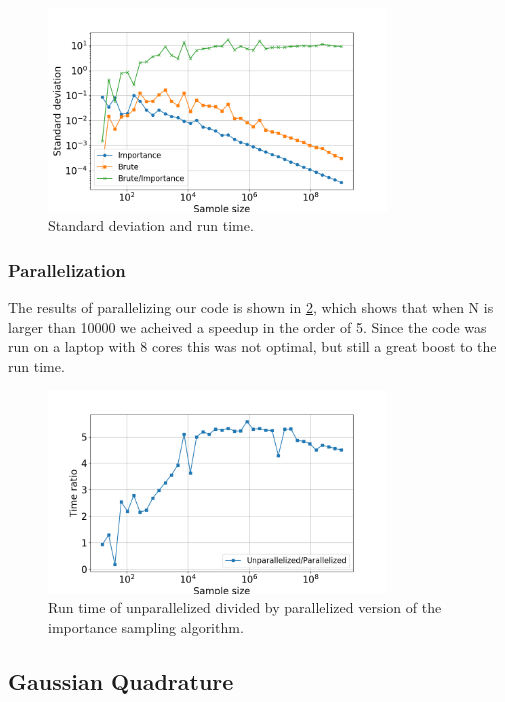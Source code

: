 \begin{figure}[H]
  \centering
  \includegraphics[width=0.8\textwidth]{../figures/mc_std_time.png}
  \caption{Standard deviation and run time.}

  \label{fig:mc_std_time}
\end{figure}

\subsubsection{Parallelization}

The results of parallelizing our code is shown in \cref{fig:mc_time_ratio}, which
shows that when N is larger than 10000 we acheived a speedup in the order of 5.
Since the code was run on a laptop with 8 cores this was not optimal, but still
a great boost to the run time.

\begin{figure}[H]
  \centering
  \includegraphics[width=0.8\textwidth]{../figures/mc_time_ratio.png}
  \caption{Run time of unparallelized divided by parallelized version
          of the importance sampling algorithm.}

  \label{fig:mc_time_ratio}
\end{figure}


\subsection{Gaussian Quadrature}

